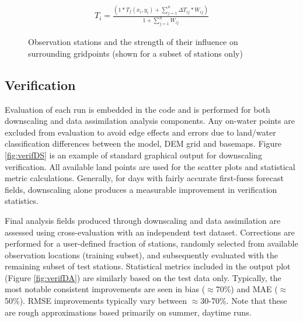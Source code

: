 \documentclass{article}
\begin{document}
\begin{eqnarray}
T_i = \frac{(1 * T_f(x_i,y_i) + \sum\limits_{j=1}^n \Delta T_{ij} * W_{ij})}{1 + \sum\limits_{j=1}^n W_{ij}}
\end{eqnarray}

\begin{landscape}
\pagestyle{empty}

\begin{figure}
\caption{Observation stations and the strength of their influence on surrounding gridpoints	 (shown for a subset of stations only)}\label{fig:MD} 
\end{figure}

\end{landscape}
\restoregeometry
\pagestyle{plain}


\FloatBarrier

\subsection{Verification}
Evaluation of each run is embedded in the code and is performed for both downscaling and data assimilation analysis components. Any on-water points are excluded from evaluation to avoid edge effects and errors due to land/water classification differences between the model, DEM grid and basemaps. Figure \ref{fig:verifDS} is an example of standard graphical output for downscaling verification. All available land points are used for the scatter plots and statistical metric calculations. Generally, for days with fairly accurate first-fuess forecast fields, downscaling alone produces a measurable improvement in verification statistics. 

Final analysis fields produced through downscaling and data assimilation are assessed using cross-evaluation with an independent test dataset. Corrections are performed for a user-defined fraction of stations, randomly selected from available observation locations (training subset), and subsequently evaluated with the remaining subset of test stations. Statistical metrics included in the output plot (Figure \ref{fig:verifDA}) are similarly based on the test data only. Typically, the most notable consistent improvements are seen in bias ($\approx$70\%) and MAE ($\approx$50\%). RMSE improvements typically vary between $\approx$30-70\%. Note that these are rough approximations based primarily on summer, daytime runs. 
\end{document}
